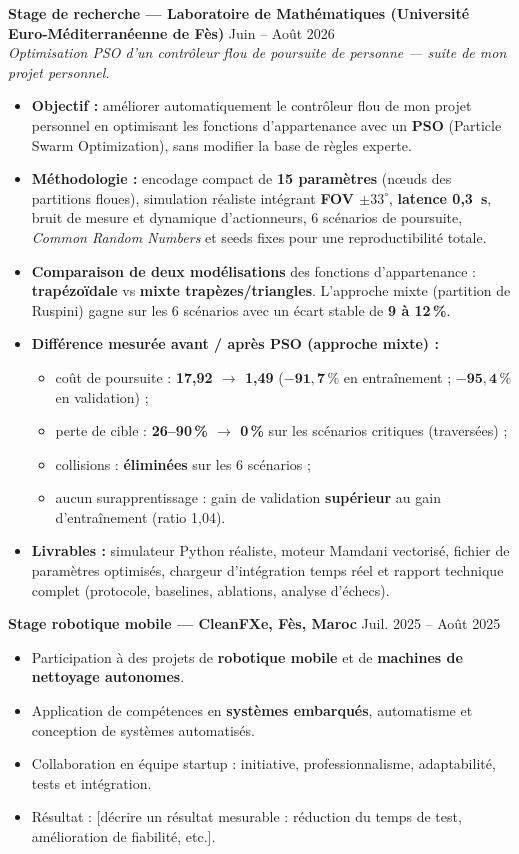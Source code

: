\documentclass[11pt,a4paper]{article}
\newcommand{\cventry}[3]{%
    \textbf{#1} \hfill #2\\
    #3
}
\begin{document}
\cventry{Stage de recherche — Laboratoire de Mathématiques (Université Euro-Méditerranéenne de Fès)}{Juin -- Août 2026}{%
\textit{Optimisation PSO d'un contrôleur flou de poursuite de personne — suite de mon projet personnel.}
\begin{itemize}[leftmargin=*, nosep]
    \item \textbf{Objectif :} améliorer automatiquement le contrôleur flou de mon projet personnel en optimisant les fonctions d'appartenance avec un \textbf{PSO} (Particle Swarm Optimization), sans modifier la base de règles experte.
    \item \textbf{Méthodologie :} encodage compact de \textbf{15 paramètres} (nœuds des partitions floues), simulation réaliste intégrant \textbf{FOV $\pm33^\circ$}, \textbf{latence 0,3~s}, bruit de mesure et dynamique d'actionneurs, 6 scénarios de poursuite, \emph{Common Random Numbers} et seeds fixes pour une reproductibilité totale.
    \item \textbf{Comparaison de deux modélisations} des fonctions d'appartenance : \textbf{trapézoïdale} vs \textbf{mixte trapèzes/triangles}. L'approche mixte (partition de Ruspini) gagne sur les 6 scénarios avec un écart stable de \textbf{9 à 12\,\%}.
    \item \textbf{Différence mesurée avant / après PSO (approche mixte) :}
      \begin{itemize}[nosep]
        \item coût de poursuite : \textbf{17,92 $\to$ 1,49} ($\mathbf{-91{,}7\,\%}$ en entraînement ; $\mathbf{-95{,}4\,\%}$ en validation) ;
        \item perte de cible : \textbf{26--90\,\% $\to$ 0\,\%} sur les scénarios critiques (traversées) ;
        \item collisions : \textbf{éliminées} sur les 6 scénarios ;
        \item aucun surapprentissage : gain de validation \textbf{supérieur} au gain d'entraînement (ratio 1,04).
      \end{itemize}
    \item \textbf{Livrables :} simulateur Python réaliste, moteur Mamdani vectorisé, fichier de paramètres optimisés, chargeur d'intégration temps réel et rapport technique complet (protocole, baselines, ablations, analyse d'échecs).
\end{itemize}
}

\cventry{Stage robotique mobile — CleanFXe, Fès, Maroc}{Juil. 2025 -- Août 2025}{%
\begin{itemize}[leftmargin=*, nosep]
    \item Participation à des projets de \textbf{robotique mobile} et de \textbf{machines de nettoyage autonomes}.
    \item Application de compétences en \textbf{systèmes embarqués}, automatisme et conception de systèmes automatisés.
    \item Collaboration en équipe startup : initiative, professionnalisme, adaptabilité, tests et intégration.
    \item Résultat : [décrire un résultat mesurable : réduction du temps de test, amélioration de fiabilité, etc.].
\end{itemize}
}
\end{document}
